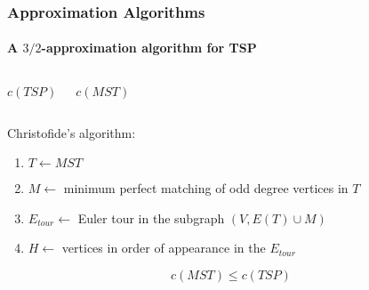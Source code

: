 \documentclass[smaller,aspectratio=169,ignorenonframetext,compress,sans,fleqn,xcolor=dvipsnames,fleqn,table,stillsansserifmath,stillsansseriftext,stillsansserifsmall,stillsansseriflarge]{beamer}
\newcommand{\plotpoints}{
  \draw node[point] (a) at (1,2) {};%
  \draw node[point] (b) at (3,0) {};%
  \draw node[point] (c) at (4,1) {};%
  \draw node[point] (d) at (7,0) {};%
  \draw node[point] (e) at (6,2) {};%
  \draw node[point] (f) at (7,4) {};%
  \draw node[point] (g) at (3,4) {};%
}
\begin{document}
\begin{frame}%

\frametitle{Approximation Algorithms}
\framesubtitle{A $3/2$-approximation algorithm for TSP}

\begin{columns}[T,onlytextwidth]

  \centering
  \begin{center}
    $c(TSP)$
  \end{center}
  \centering
   \begin{center}
    $c(MST)$
  \end{center}
\end{columns}

\bigskip

\begin{overprint}

\begin{framed}
  \medskip
  Christofide's algorithm:
\begin{enumerate}
\item $T\leftarrow MST$
\item $M\leftarrow$ minimum perfect matching of odd degree vertices in
  $T$
\item $E_{tour}\leftarrow$ Euler tour in the subgraph $(V,E(T) \cup M)$
\item $H\leftarrow $ vertices in order of appearance in the $E_{tour}$
\end{enumerate}
\end{framed}

\begin{center}
\[
c(MST)\leq c(TSP)
\]
\end{center}

\end{overprint}

\end{frame}
\end{document}
